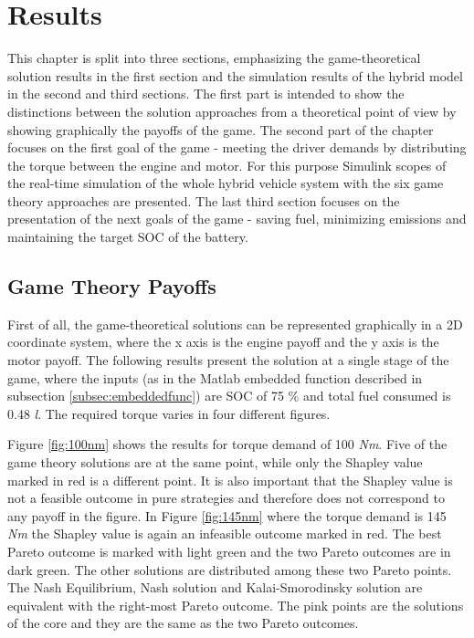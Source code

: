 \chapter{Results}
\label{chp:results}

This chapter is split into three sections, emphasizing the game-theoretical solution results in the first section and the simulation results of the hybrid model in the second and third sections. The first part is intended to show the distinctions between the solution approaches from a theoretical point of view by showing graphically the payoffs of the game. The second part of the chapter focuses on the first goal of the game - meeting the driver demands by distributing the torque between the engine and motor. For this purpose Simulink scopes of the real-time simulation of the whole hybrid vehicle system with the six game theory approaches are presented. The last third section focuses on the presentation of the next goals of the game - saving fuel, minimizing emissions and maintaining the target SOC of the battery.

\section{Game Theory Payoffs}
First of all, the game-theoretical solutions can be represented graphically in a 2D coordinate system, where the x axis is the engine payoff and the y axis is the motor payoff. The following results present the solution at a single stage of the game, where the inputs (as in the Matlab embedded function described in subsection \ref{subsec:embeddedfunc}) are SOC of 75 \% and total fuel consumed is 0.48 \textit{l}. The required torque varies in four different figures. 

Figure \ref{fig:100nm} shows the results for torque demand of 100 \textit{Nm}. Five of the game theory solutions are at the same point, while only the Shapley value marked in red is a different point. It is also important that the Shapley value is not a feasible outcome in pure strategies and therefore does not correspond to any payoff in the figure. In Figure \ref{fig:145nm} where the torque demand is 145 \textit{Nm} the Shapley value is again an infeasible outcome marked in red. The best Pareto outcome is marked with light green and the two Pareto outcomes are in dark green. The other solutions are distributed among these two Pareto points. The Nash Equilibrium, Nash solution and Kalai-Smorodinsky solution are equivalent with the right-most Pareto outcome. The pink points are the solutions of the core and they are the same as the two Pareto outcomes.


